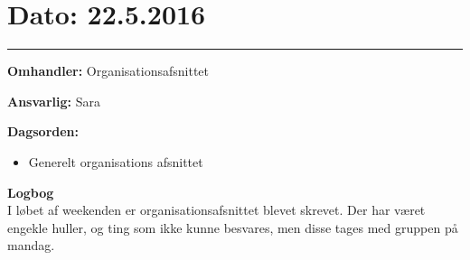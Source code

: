 \section{Dato: 22.5.2016}
\hrule

\textbf{Omhandler:} Organisationsafsnittet

\textbf{Ansvarlig:} Sara

\textbf{Dagsorden:}
\begin{itemize}
	\item Generelt organisations afsnittet
\end{itemize}

\textbf{Logbog}
\\
I løbet af weekenden er organisationsafsnittet blevet skrevet. Der har været engekle huller, og ting som ikke kunne besvares, men disse tages med gruppen på mandag. 

\\ \\




